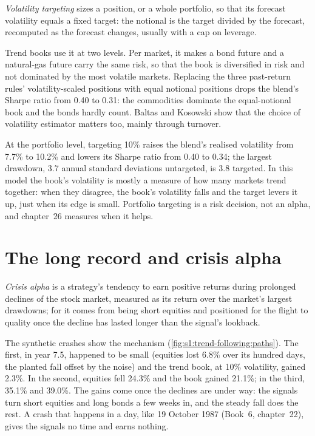\begin{definition}\label{def:s1:trend-following:voltarget}
\emph{Volatility targeting} sizes a position, or a whole portfolio, so that its forecast volatility equals a fixed target:
the notional is the target divided by the forecast, recomputed as the forecast changes, usually with a cap on leverage.
\end{definition}

Trend books use it at two levels. Per market, it makes a bond future and a natural-gas future carry the same risk, so that the book is diversified in
risk and not dominated by the most volatile markets. Replacing the three past-return rules' volatility-scaled positions with equal notional positions
drops the blend's Sharpe ratio from 0.40 to 0.31: the commodities dominate the equal-notional book and the bonds hardly count. Baltas and Kosowski
show that the choice of volatility estimator matters too, mainly through turnover.

At the portfolio level, targeting 10\% raises the blend's realised volatility from 7.7\% to 10.2\% and lowers its Sharpe ratio from 0.40 to 0.34; the
largest drawdown, 3.7 annual standard deviations untargeted, is 3.8 targeted. In this model the book's volatility is mostly a measure of how many markets
trend together: when they disagree, the book's volatility falls and the target levers it up, just when its edge is small. Portfolio targeting is a risk
decision, not an alpha, and chapter~26 measures when it helps.

\section{The long record and crisis alpha}

\begin{definition}\label{def:s1:trend-following:crisis}
\emph{Crisis alpha} is a strategy's tendency to earn positive returns during prolonged declines of the stock market, measured as its
return over the market's largest drawdowns; for  it comes from being short equities and positioned for the flight to quality once the
decline has lasted longer than the signal's lookback.
\end{definition}

The synthetic crashes show the mechanism (\cref{fig:s1:trend-following:paths}). The first, in year 7.5, happened to be small (equities lost 6.8\% over
its hundred days, the planted fall offset by the noise) and the trend book, at 10\% volatility, gained 2.3\%. In the second, equities fell 24.3\% and the
book gained 21.1\%; in the third, 35.1\% and 39.0\%. The gains come once the declines are under way: the signals turn short equities and long bonds a few
weeks in, and the steady fall does the rest. A crash that happens in a day, like 19 October 1987 (Book~6, chapter~22), gives the signals no time and
earns nothing.

